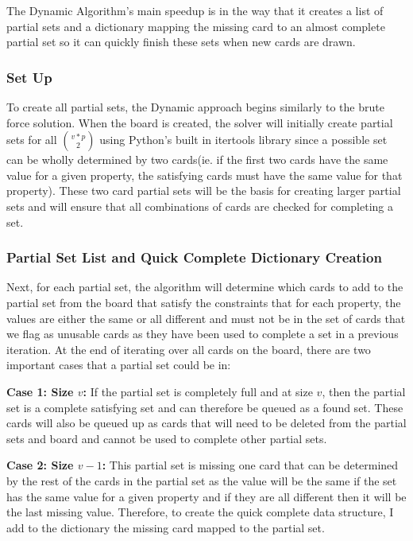 \documentclass[pageno]{jpaper}
\begin{document}
The Dynamic Algorithm's main speedup is in the way that it creates a list of partial sets and a dictionary mapping the missing card to an almost complete partial set so it can quickly finish these sets when new cards are drawn. 

\subsubsection{Set Up}

To create all partial sets, the Dynamic approach begins similarly to the brute force solution. When the board is created, the solver will initially create partial sets for all ${v*p}\choose{2}$ using Python's built in itertools library since a possible set can be wholly determined by two cards(ie. if the first two cards have the same value for a given property, the satisfying cards must have the same value for that property). These two card partial sets will be the basis for creating larger partial sets and will ensure that all combinations of cards are checked for completing a set. 

\subsubsection{Partial Set List and Quick Complete Dictionary Creation}

Next, for each partial set, the algorithm will determine which cards to add to the partial set from the board that satisfy the constraints that for each property, the values are either the same or all different and must not be in the set of cards that we flag as unusable cards as they have been used to complete a set in a previous iteration. At the end of iterating over all cards on the board, there are two important cases that a partial set could be in:

\textbf{Case 1: Size $v$:} If the partial set is completely full and at size $v$, then the partial set is a complete satisfying set and can therefore be queued as a found set. These cards will also be queued up as cards that will need to be deleted from the partial sets and board and cannot be used to complete other partial sets.

\textbf{Case 2: Size $v-1$:} This partial set is missing one card that can be determined by the rest of the cards in the partial set as the value will be the same if the set has the same value for a given property and if they are all different then it will be the last missing value. Therefore, to create the quick complete data structure, I add to the dictionary the missing card mapped to the partial set. 
\end{document}
